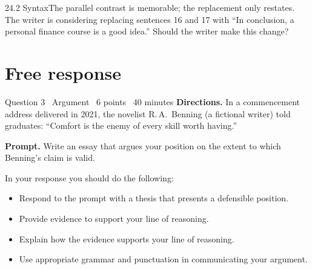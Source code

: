 \documentclass[11pt]{article}
\begin{document}
\begin{q}{2}{4.2 Syntax}{The parallel contrast is memorable; the replacement only restates.}
The writer is considering replacing sentences 16 and 17 with ``In conclusion, a personal finance course is a good idea.'' Should the writer make this change?
\end{q}

\section{Free response}

\begin{frq}{Question 3 \textperiodcentered\ Argument \textperiodcentered\ 6 points \textperiodcentered\ 40 minutes}
\small
\textbf{Directions.} In a commencement address delivered in 2021, the novelist R.\,A.\ Benning (a fictional writer) told graduates: ``Comfort is the enemy of every skill worth having.''

\textbf{Prompt.} Write an essay that argues your position on the extent to which Benning's claim is valid.

In your response you should do the following:
\begin{itemize}[leftmargin=1.5em,itemsep=1pt]
\item Respond to the prompt with a thesis that presents a defensible position.
\item Provide evidence to support your line of reasoning.
\item Explain how the evidence supports your line of reasoning.
\item Use appropriate grammar and punctuation in communicating your argument.
\end{itemize}
\end{frq}

\makekey
\end{document}
